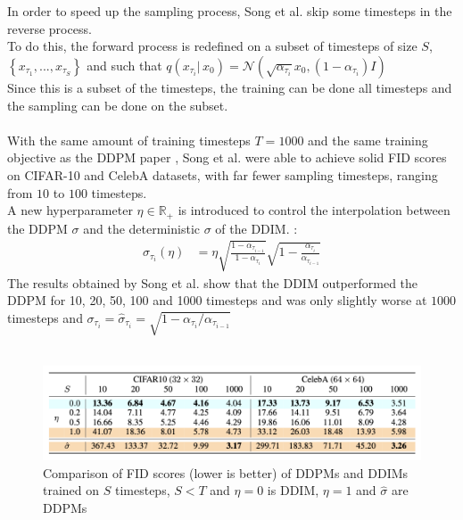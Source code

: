 \documentclass{article}
\begin{document}
\\\\
In order to speed up the sampling process, Song et al. \cite{song2022denoising} skip some timesteps in the reverse process. \\
To do this, the forward process is redefined on a subset of timesteps of size $S$, $\left\{ x_{\tau_1}, ..., x_{\tau_S} \right\}$ and such that $q(x_{\tau_i} | \, x_0) = \mathcal{N}(\sqrt{\alpha_{\tau_i}} x_0, (1 - \alpha_{\tau_i})I)$ \\
Since this is a subset of the timesteps, the training can be done all timesteps and the sampling can be done on the subset. \cite{song2022denoising}
\\\\
With the same amount of training timesteps $T = 1000$ and the same training objective as the DDPM paper \cite{ho2020denoising}, Song et al. \cite{song2022denoising} were able to achieve solid FID scores on CIFAR-10 \cite{cifar10} and CelebA \cite{liu2015faceattributes} datasets, with far fewer sampling timesteps, ranging from $10$ to $100$ timesteps. \cite{song2022denoising} \\
A new hyperparameter $\eta \in \mathbb{R}_+$ is introduced to control the interpolation between the DDPM $\sigma$ and the deterministic $\sigma$ of the DDIM. \cite{song2022denoising}:
\begin{align}
  \sigma_{\tau_i} (\eta) &= \eta \sqrt{\frac{1 - \alpha_{\tau_{i-1}}}{1 - \alpha_{\tau_i}}} \sqrt{1 - \frac{\alpha_{\tau_i}}{\alpha_{\tau_{i-1}}}}
\end{align}
The results obtained by Song et al. \cite{song2022denoising} show that the DDIM outperformed the DDPM for 10, 20, 50, 100 and 1000 timesteps and was only slightly worse at $1000$ timesteps and $\sigma_{\tau_i} = \hat{\sigma}_{\tau_i} = \sqrt{1 - \alpha_{\tau_i} / \alpha_{\tau_{i-1}}}$
\\\\
\begin{figure}[h]
  \begin{center}
    \includegraphics[width=\textwidth]{images/ddim_table.png}
    \caption{Comparison of FID scores (lower is better) of DDPMs and DDIMs trained on $S$ timesteps, $S < T$ and $\eta = 0$ is DDIM, $\eta = 1$ and $\hat{\sigma}$ are DDPMs \cite{song2022denoising}}
  \end{center}
\end{figure}
\\\\
\end{document}
